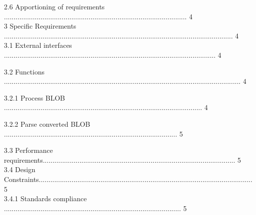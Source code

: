 \documentclass[10pt,draftclsnofoot,onecolumn]{IEEEtran}
\newcommand\tab[1][1cm]{\hspace*{#1}}
\begin{document}
\tab 2.6 Apportioning of requirements ............................................................................................... 4\\
                 \vspace{5mm}
3 Specific Requirements ....................................................................................................................... 4\\
                 \vspace{5mm}
\tab 3.1 External interfaces .............................................................................................................. 4\\
                 \vspace{5mm}
                 
\tab 3.2 Functions ........................................................................................................................... 4\\
                 \vspace{5mm}
                 
\tab \tab 3.2.1 Process BLOB ....................................................................................................... 4\\
                 \vspace{5mm}
                 
\tab \tab 3.2.2 Parse converted BLOB .......................................................................................... 5\\
                 \vspace{5mm}
                 
\tab 3.3 Performance requirements.................................................................................................... 5\\
                 \vspace{5mm}
\tab 3.4 Design Constraints............................................................................................................... 5\\
                 \vspace{5mm}
\tab \tab 3.4.1 Standards compliance ............................................................................................ 5\\
                 \vspace{5mm}
                 
\end{document}
